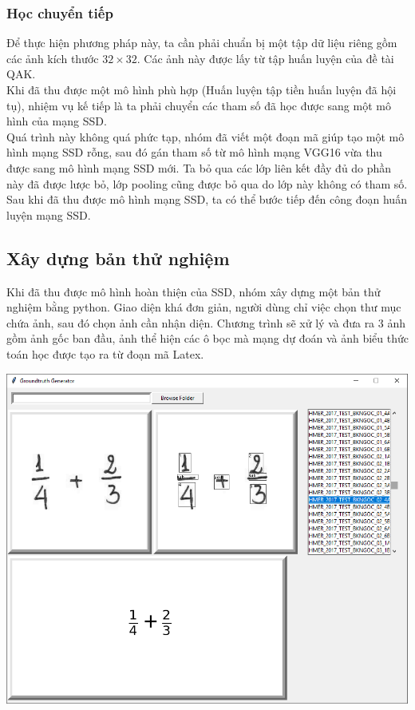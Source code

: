 \documentclass[a4paper,12pt]{article}
\begin{document}
	\subsubsection*{Học chuyển tiếp}
	
	Để thực hiện phương pháp này, ta cần phải chuẩn bị một tập dữ liệu riêng gồm các ảnh kích thước $32 \times 32$. Các ảnh này được lấy từ tập huấn luyện của đề tài QAK.\\
	
	Khi đã thu được một mô hình phù hợp (Huấn luyện tập tiền huấn luyện đã hội tụ), nhiệm vụ kế tiếp là ta phải chuyển các tham số đã học được sang một mô hình của mạng SSD.\\
	
	Quá trình này không quá phức tạp, nhóm đã viết một đoạn mã giúp tạo một mô hình mạng SSD rỗng, sau đó gán tham số từ mô hình mạng VGG16 vừa thu được sang mô hình mạng SSD mới. Ta bỏ qua các lớp liên kết đầy đủ do phần này đã được lược bỏ, lớp pooling cũng được bỏ qua do lớp này không có tham số. \\
	
	Sau khi đã thu được mô hình mạng SSD, ta có thể bước tiếp đến công đoạn huấn luyện mạng SSD.
	
	\subsection{Xây dựng bản thử nghiệm}
	
	Khi đã thu được mô hình hoàn thiện của SSD, nhóm xây dựng một bản thử nghiệm bằng python. Giao diện khá đơn giản, người dùng chỉ việc chọn thư mục chứa ảnh, sau đó chọn ảnh cần nhận diện. Chương trình sẽ xử lý và đưa ra 3 ảnh gồm ảnh gốc ban đầu, ảnh thể hiện các ô bọc mà mạng dự đoán và ảnh biểu thức toán học được tạo ra từ đoạn mã Latex.
	
	\begin{center}
		
		\centering
		\includegraphics[width=0.8\linewidth]{demoImg.png}
		\vspace{0.5cm}
	\end{center}
	
\end{document}
